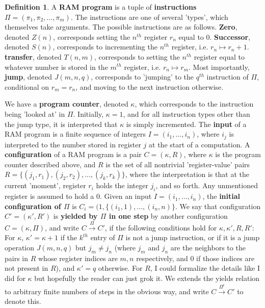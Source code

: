 \documentclass{article}
\theoremstyle{definition}
\newtheorem{definition}{Definition}[section]
\theoremstyle{plain}
\theoremstyle{theorem}
\begin{document}
\begin{definition}
	A \textbf{RAM program} is a tuple of \textbf{instructions} $\Pi = (\pi_1,\pi_2,...,\pi_m)$. The instructions are one of several 'types', which themselves take arguments. The possible instructions are as follows. \textbf{Zero}, denoted $Z(n)$, corresponds setting the $n^{th}$ register $r_n$ equal to $0$. \textbf{Successor}, denoted $S(n)$, corresponds to incrementing the $n^{th}$ register, i.e. $r_n \mapsto r_n+1$. \textbf{transfer}, denoted $T(n,m)$, corresponds to setting the $n^{th}$ register equal to whatever number is stored in the $m^{th}$ register, i.e. $r_n \mapsto r_m$. Most importantly, \textbf{jump}, denoted $J(m,n,q)$, corresponds to 'jumping' to the $q^{th}$ instruction of $\Pi$, conditional on $r_m = r_n$, and moving to the next instruction otherwise. 
	\par We have a \textbf{program counter}, denoted $\kappa$, which corresponds to the instruction being 'looked at' in $\Pi$. Initially, $\kappa = 1$, and for all instruction types other than the jump type, it is interpreted that $\kappa$ is simply incremented. The \textbf{input} of a RAM program is a finite sequence of integers $I = (i_1,...,i_n)$, where $i_j$ is interpreted to the number stored in register $j$ at the start of a computation. A \textbf{configuration} of a RAM program is a pair $C = (\kappa,R)$, where $\kappa$ is the program counter described above, and $R$ is the set of all nontrivial 'register-value' pairs $R = \{(j_1,r_1),(j_2,r_2),...,(j_k,r_k)\}$, where the interpretation is that at the current 'moment', register $r_i$ holds the integer $j_i$, and so forth. Any unmentioned register is assumed to hold a $0$. Given an input $I = (i_1,...,i_n)$, the \textbf{initial configuration of $\Pi$} is $C_i = (1,\{(i_1,1),...,(i_n,n)\}$. We say that configuration $C' = (\kappa',R')$ is \textbf{yielded by $\Pi$ in one step} by another configuration $C = (\kappa,\Pi)$, and write $C \overset{\Pi}{\to} C'$, if the following conditions hold for $\kappa,\kappa ',R,R'$: For $\kappa$, $\kappa ' = \kappa+1$ if the $k^{th}$ entry of $\Pi$ is not a jump instruction, or if it is a jump operation $J(m,n,q)$ but $j_m \neq j_n$ (where $j_m$ and $j_n$ are the neighbors to the pairs in $R$ whose register indices are $m,n$ respectively, and $0$ if those indices are not present in $R$), and $\kappa ' = q$ otherwise. For $R$, I could formalize the details like I did for $\kappa$ but hopefully the reader can just grok it. We extends the yields relation to arbitrary finite numbers of steps in the obvious way, and write $C \overset{\Pi^t}{\to} C'$ to denote this. 

\end{definition}
\end{document}
